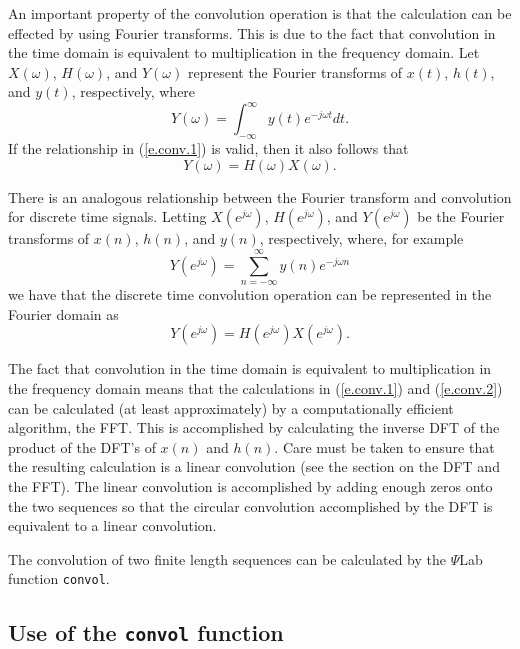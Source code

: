 	An important property of the convolution operation is that
the calculation can be effected by using Fourier transforms.
This is due to the fact that convolution in the time domain is equivalent
to multiplication in the frequency domain.  
Let $X(\omega)$, $H(\omega)$, and $Y(\omega)$ represent
the Fourier transforms of $x(t)$, $h(t)$, and $y(t)$, respectively, where
%
\begin{equation}
Y(\omega)=\int_{-\infty}^{\infty}y(t)e^{-j\omega t}dt.
\label{e.conv.6}
\end{equation}
%
If the relationship in (\ref{e.conv.1}) is valid, then it also follows that
%
\begin{equation}
Y(\omega)=H(\omega)X(\omega).
\label{e.conv.5}
\end{equation}
%

	There is an analogous relationship between the Fourier transform
and convolution for discrete time signals.  
Letting
$X(e^{j\omega})$, $H(e^{j\omega})$, and $Y(e^{j\omega})$ be the 
Fourier transforms of $x(n)$, $h(n)$, and $y(n)$, respectively, where,
for example
%
\begin{equation}
Y(e^{j\omega})=\sum_{n=-\infty}^{\infty}y(n)e^{-j\omega n}
\label{e.conv.8}
\end{equation}
%
we have that
the discrete time convolution operation can be represented in the
Fourier domain as
%
\begin{equation}
Y(e^{j\omega})=H(e^{j\omega})X(e^{j\omega}).
\label{e.conv.7}
\end{equation}
%

	
	The fact that convolution in the time domain is equivalent to
multiplication in the frequency domain means that the 
calculations in (\ref{e.conv.1}) and (\ref{e.conv.2}) can be
calculated (at least approximately) by a computationally efficient
algorithm, the FFT.
This is accomplished by calculating the inverse DFT 
of the product of the DFT's of $x(n)$ and $h(n)$. 
Care must be taken to ensure that the resulting calculation is
a linear convolution (see the section on the DFT and the FFT).  
The linear convolution is accomplished by adding enough zeros onto
the two sequences so that the circular convolution accomplished by
the DFT is equivalent to a linear convolution.

	The convolution of two finite length sequences can be
calculated by the $\Psi$Lab function {\tt convol}.

\subsection{Use of the {\tt convol} function}

